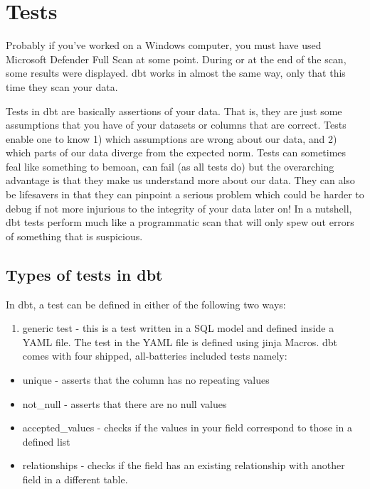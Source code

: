 \documentclass[
]{book}
\providecommand{\tightlist}{%
  \setlength{\itemsep}{0pt}\setlength{\parskip}{0pt}}
\begin{document}
\hypertarget{tests-1}{%
\chapter{Tests}\label{tests-1}}

Probably if you've worked on a Windows computer, you must have used Microsoft Defender Full Scan at some point. During or at the end of the scan, some results were displayed. dbt works in almost the same way, only that this time they scan your data.

Tests in dbt are basically assertions of your data. That is, they are just some assumptions that you have of your datasets or columns that are correct. Tests enable one to know 1) which assumptions are wrong about our data, and 2) which parts of our data diverge from the expected norm. Tests can sometimes feal like something to bemoan, can fail (as all tests do) but the overarching advantage is that they make us understand more about our data. They can also be lifesavers in that they can pinpoint a serious problem which could be harder to debug if not more injurious to the integrity of your data later on! In a nutshell, dbt tests perform much like a programmatic scan that will only spew out errors of something that is suspicious.

\hypertarget{types-of-tests-in-dbt}{%
\section{Types of tests in dbt}\label{types-of-tests-in-dbt}}

In dbt, a test can be defined in either of the following two ways:

\begin{enumerate}
\def\labelenumi{\arabic{enumi}.}
\tightlist
\item
  generic test - this is a test written in a SQL model and defined inside a YAML file. The test in the YAML file is defined using jinja Macros. dbt comes with four shipped, all-batteries included tests namely:
\end{enumerate}

\begin{itemize}
\tightlist
\item
  unique - asserts that the column has no repeating values
\item
  not\_null - asserts that there are no null values
\item
  accepted\_values - checks if the values in your field correspond to those in a defined list
\item
  relationships - checks if the field has an existing relationship with another field in a different table.
\end{itemize}
\end{document}
